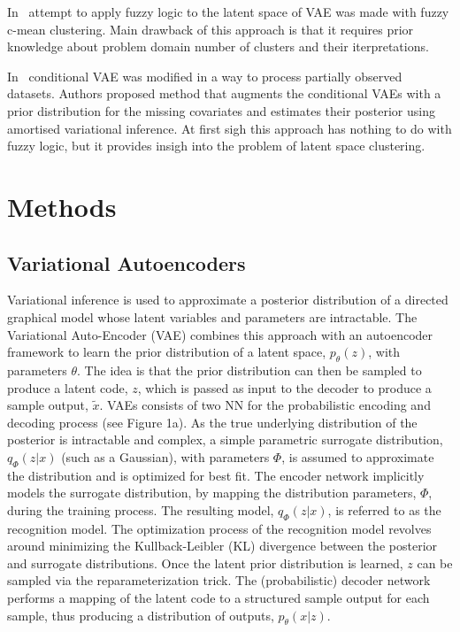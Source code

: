 \documentclass[runningheads]{llncs}
\begin{document}
In~\cite{Bolat2020} attempt to apply fuzzy logic to the latent space of VAE was made with fuzzy c-mean clustering.
Main drawback of this approach is that it requires prior knowledge about problem domain number of clusters and their iterpretations.



In~\cite{RAMCHANDRAN2024110113} conditional VAE was modified in a way to process partially observed datasets. 
Authors proposed method that augments the conditional VAEs with a prior distribution for the missing covariates and estimates their posterior using amortised variational inference.
At first sigh this approach has nothing to do with fuzzy logic, but it provides insigh into the problem of latent space clustering.



\section{Methods}

\subsection{Variational Autoencoders}
Variational inference is used to approximate a posterior distribution of a directed graphical model whose latent variables and parameters are intractable.
The Variational Auto-Encoder (VAE) combines this approach with an autoencoder framework to learn the prior distribution of a latent space, $p_\theta(z)$, with parameters $\theta$.
The idea is that the prior distribution can then be sampled to produce a latent code, $z$, which is passed as input to the decoder to produce a sample output, $\tilde{x}$. 
VAEs consists of two NN for the probabilistic encoding and decoding process (see Figure 1a). 
As the true underlying distribution of the posterior is intractable and complex, a simple parametric surrogate distribution, $q_\Phi(z|x)$ (such as a Gaussian), with parameters $\Phi$, is assumed to approximate the distribution and is optimized for best fit. 
The encoder network implicitly models the surrogate distribution, by mapping the distribution parameters, $\Phi$, during the training process. 
The resulting model, $q_\Phi(z|x)$, is referred to as the recognition model. 
The optimization process of the recognition model revolves around minimizing the Kullback-Leibler (KL) divergence between the posterior and surrogate distributions.
Once the latent prior distribution is learned, $z$ can be sampled via the reparameterization trick.
The (probabilistic) decoder network performs a mapping of the latent code to a structured sample output for each sample, thus producing a distribution of outputs, $p_\theta (x|z)$.
\end{document}
